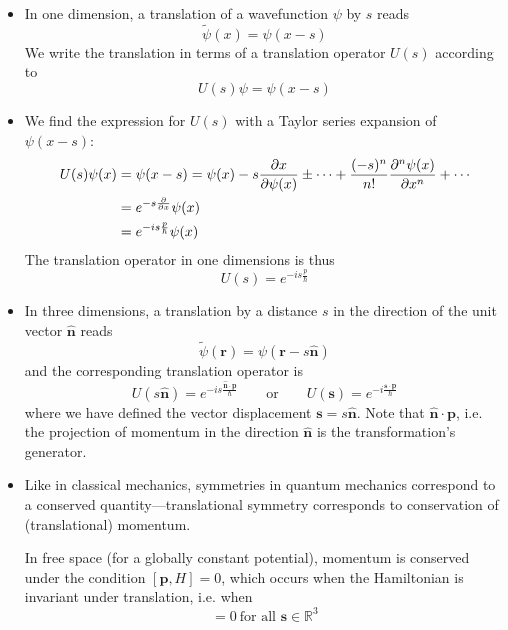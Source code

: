 \documentclass[11pt, a4paper]{article}
\newcommand{\eqtext}[1]{\qquad \text{#1} \qquad}
\renewcommand{\vec}[1]{\bm{#1}} %
\newcommand{\uvec}[1]{\hat{\vec{#1}}} %
\renewcommand{\r}{\vec{r}}  %
\newcommand{\p}{\psi}  %
\begin{document}
\begin{itemize}
	\item In one dimension, a translation of a wavefunction $ \p $ by $ s $ reads
	\begin{equation*}
		\tilde{\p}(x) = \p(x - s)
	\end{equation*}
	We write the translation in terms of a translation operator $ U(s) $ according to
	\begin{equation*}
		U(s)\p = \p(x - s)
	\end{equation*}
	
	\item We find the expression for $ U(s) $ with a Taylor series expansion of $ \p(x - s) $:
	\begin{align*}
		U(s)\p(x) &= \p(x - s) = \p(x) - s \pdv{x}{\p(x)} \pm  \cdots + \frac{(-s)^{n}}{n!}\pdv[n]{\p(x)}{x} + \cdots \\
		& = e^{-s \pdv{x}}\p(x) \\
		& = e^{-is\frac{p}{\hbar}}\p(x)
	\end{align*}
	The translation operator in one dimensions is thus
	\begin{equation*}
		U(s) = e^{-is\frac{p}{\hbar}}
	\end{equation*}
	
	\item In three dimensions, a translation by a distance $ s $ in the direction of the unit vector $ \uvec{n} $ reads
	\begin{equation*}
		\tilde{\p}(\r) = \p(\r - s\uvec{n})
	\end{equation*}
	and the corresponding translation operator is
	\begin{equation*}
		U(s \uvec{n}) = e^{-is \frac{\uvec{n}\cdot \vec{p}}{\hbar}} \eqtext{or} U(\vec{s}) = e^{-i \frac{\vec{s}\cdot \vec{p}}{\hbar}}
	\end{equation*}
	where we have defined the vector displacement $ \vec{s} = s \uvec{n} $. Note that $ \uvec{n}\cdot \vec{p} $, i.e. the projection of momentum in the direction $ \uvec{n} $ is the transformation's generator.
	
	\item Like in classical mechanics, symmetries in quantum mechanics correspond to a conserved quantity---translational symmetry corresponds to conservation of (translational) momentum. 
	
	In free space (for a globally constant potential), momentum is conserved under the condition $ [\vec{p}, H] = 0 $, which occurs when the Hamiltonian is invariant under translation, i.e. when
	\begin{equation*}
		[U(\vec{s}), H] = 0 \ \text{for all } \vec{s} \in \mathbb{R}^{3}
	\end{equation*}
	

\end{itemize}
\end{document}

